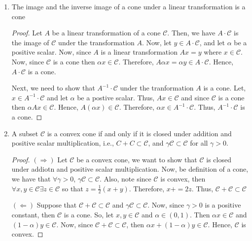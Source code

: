 \begin{enumerate}[label=(\alph*)]
  \item{The image and the inverse image of a cone under a linear
    transformation is a cone
    \begin{proof}
      Let $A$ be a linear transformation of a cone $\mathcal{C}$. Then, we
      have $A \cdot \mathcal{C}$ is the image of $\mathcal{C}$ under the
      transformation $A$. Now, let $y \in A \cdot \mathcal{C}$, and let
      $\alpha$ be a positive scalar. Now, since $A$ is a linear
      transformation $A x = y$ where $x \in \mathcal{C}$. Now, since
      $\mathcal{C}$ is a cone then $\alpha x \in \mathcal{C}$. Therefore,
      $A \alpha x = \alpha y \in A \cdot \mathcal{C}$. Hence,
      $A \cdot \mathcal{C}$ is a cone.

      Next, we need to show that $A^{-1} \cdot \mathcal{C}$ under the
      tranformation $A$ is a cone.  Let, $x \in A^{-1} \cdot \mathcal{C}$
      and let $\alpha$ be a postive scalar. Thus, $A x \in \mathcal{C}$ and
      since $\mathcal{C}$ is a cone then $\alpha A x \in \mathcal{C}$. Hence,
      $A(\alpha x) \in \mathcal{C}$. Therefore, $\alpha x \in A^{-1} \cdot \mathcal{C}$.  Thus, $A^{-1} \cdot \mathcal{C}$ is a cone.
    \end{proof}}    
  \item{A subset $\mathcal{C}$ is a convex cone if and only if it is closed
    under addition and positive scalar multiplication, i.e.,
    $C + C \subset \mathcal{C}$, and
    $\gamma \mathcal{C} \subset \mathcal{C}$ for all $\gamma > 0$.
    \begin{proof}
      $(\Rightarrow)$ Let $\mathcal{C}$ be a convex cone, we want to show that
      $\mathcal{C}$ is closed under addiotn and positive scalar multiplication.
      Now, be definition of a cone, we have that $\forall \gamma > 0$,
      $\gamma \mathcal{C} \subset \mathcal{C}$. Also, note since $\mathcal{C}$
      is convex, then $\forall x,y \in \mathcal{C} \exists z \in \mathcal{C}$
      so that $z = \frac{1}{2}(x + y)$.  Therefore, $x + = 2z$. Thus,
      $\mathcal{C} + \mathcal{C} \subset \mathcal{C}$

      $(\Leftarrow)$ Suppose that $\mathcal{C} + \mathcal{C} \subset \mathcal{C}$ and $\gamma \mathcal{C} \subset \mathcal{C}$. Now, since $\gamma > 0$ is a
      positive constant, then $\mathcal{C}$ is a cone. So, let $x,y \in \mathcal{C}$ and $\alpha \in (0,1)$. Then $\alpha x \in \mathcal{C}$ and $(1-\alpha)y \in \mathcal{C}$. Now, since $\mathcal{C} + \mathcal{C} \subset \mathcal{C}$, then
      $\alpha x + (1-\alpha)y \in \mathcal{C}$. Hence, $\mathcal{C}$ is convex.
    \end{proof}}    
  \end{enumerate}
